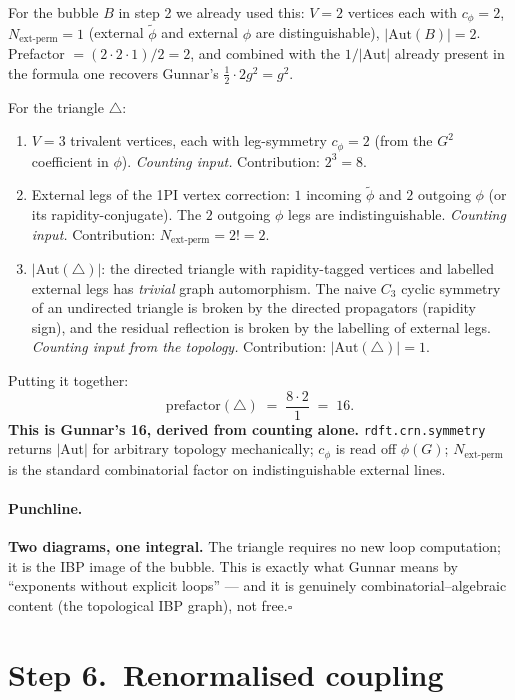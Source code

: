 \documentclass[11pt,a4paper]{article}
\begin{document}
\begin{cfacbox}
\smallskip
For the bubble $B$ in step 2 we already used this: $V=2$ vertices each with $c_{\phi}=2$,
$N_{\text{ext-perm}}=1$ (external $\widetilde\phi$ and external $\phi$ are
distinguishable), $|\mathrm{Aut}(B)|=2$. Prefactor $= (2\cdot 2 \cdot 1)/2 = 2$, and
combined with the $1/|\mathrm{Aut}|$ already present in the formula one recovers Gunnar's
$\tfrac{1}{2}\cdot 2 g^{2} = g^{2}$.

\smallskip
For the triangle $\triangle$:
\begin{enumerate}[itemsep=2pt,leftmargin=2em,label=(\roman*)]
\item $V=3$ trivalent vertices, each with leg-symmetry $c_{\phi}=2$ (from the $G^{2}$
coefficient in $\phi$). \emph{Counting input.} Contribution: $2^{3}=8$.
\item External legs of the 1PI vertex correction: $1$ incoming $\widetilde\phi$ and $2$
outgoing $\phi$ (or its rapidity-conjugate). The $2$ outgoing $\phi$ legs are
indistinguishable. \emph{Counting input.} Contribution: $N_{\text{ext-perm}} = 2!= 2$.
\item $|\mathrm{Aut}(\triangle)|$: the directed triangle with rapidity-tagged vertices and
labelled external legs has \emph{trivial} graph automorphism. The naive $C_{3}$ cyclic
symmetry of an undirected triangle is broken by the directed propagators (rapidity sign),
and the residual reflection is broken by the labelling of external legs. \emph{Counting
input from the topology.} Contribution: $|\mathrm{Aut}(\triangle)| = 1$.
\end{enumerate}
Putting it together:
\[
\text{prefactor}(\triangle) \;=\; \frac{8 \cdot 2}{1} \;=\; 16.
\]
\textbf{This is Gunnar's 16, derived from counting alone.} \texttt{rdft.crn.symmetry}
returns $|\mathrm{Aut}|$ for arbitrary topology mechanically; $c_{\phi}$ is read off
$\phi(G)$; $N_{\text{ext-perm}}$ is the standard combinatorial factor on indistinguishable
external lines.

\paragraph{Punchline.} \textbf{Two diagrams, one integral.} The triangle requires no new
loop computation; it is the IBP image of the bubble. This is exactly what Gunnar means
by ``exponents without explicit loops'' --- and it is genuinely combinatorial--algebraic
content (the topological IBP graph), not free.\hfill$\square$
\end{cfacbox}

\section*{Step 6.\ Renormalised coupling}
\end{document}
